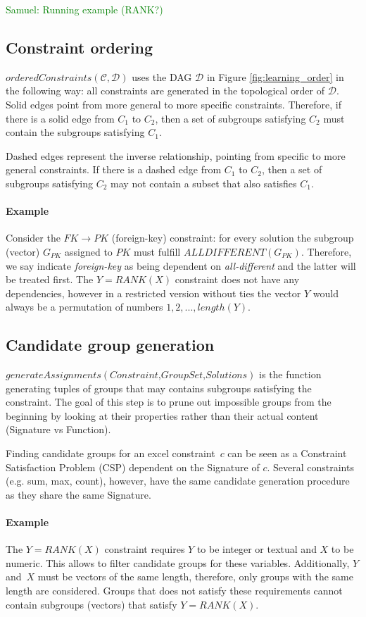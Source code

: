 \documentclass{ecai}
\newcommand{\samuel}[1]{\textcolor{green}{{\sc Samuel:} #1}\xspace}
\newcommand{\constraints}{\ensuremath{\mathcal{C}}\xspace}
\newcommand{\format}[1]{\textit{#1}\xspace}
\newcommand{\generategroups}{\format{generateAssignments}}
\newcommand{\constrainttorder}{\format{orderedConstraints}}
\newcommand{\CSignature}{Signature\xspace}
\newcommand{\CFunction}{Function\xspace}
\newcommand{\dependencies}{\ensuremath{\mathcal{D}}\xspace}
\newcommand{\ecrank}[2]{\ensuremath{#1 = \mathit{RANK}(#2)}}
\newcommand{\ecfkey}[2]{\ensuremath{#1 \rightarrow #2}}
\newcommand{\ecalldiff}[1]{\ensuremath{\mathit{ALLDIFFERENT}(#1)}}
\begin{document}
\samuel{Running example (RANK?)}
\subsection{Constraint ordering} $\constrainttorder(\constraints,\dependencies)$ uses the DAG \dependencies in Figure \ref{fig:learning_order} in the following way: all constraints are generated in the topological order of \dependencies.
Solid edges point from more general to more specific constraints.
Therefore, if there is a solid edge from $C_1$ to $C_2$, then a set of subgroups satisfying $C_2$ must contain the subgroups satisfying $C_1$.

Dashed edges represent the inverse relationship, pointing from specific to more general constraints.
If there is a dashed edge from $C_1$ to $C_2$, then a set of subgroups satisfying $C_2$ may not contain a subset that also satisfies $C_1$.

\paragraph{Example}
Consider the \ecfkey{FK}{PK} (foreign-key) constraint: for every solution the subgroup (vector) $G_{PK}$ assigned to $PK$ must fulfill \ecalldiff{G_{PK}}.
Therefore, we say indicate \textit{foreign-key} as being dependent on \textit{all-different} and the latter will be treated first.
The \ecrank{Y}{X} constraint does not have any dependencies, however in a restricted version without ties the vector $Y$ would always be a permutation of numbers $1, 2, ..., length(Y)$.

\subsection{Candidate group generation}
$\generategroups(\textit{Constraint,GroupSet,Solutions})$ is the function generating tuples of groups that may contains subgroups satisfying the constraint.
The goal of this step is to prune out impossible groups from the beginning by looking at their properties rather than their actual content (\CSignature vs \CFunction).

Finding candidate groups for an excel constraint~$c$ can be seen as a Constraint Satisfaction Problem (CSP) dependent on the \CSignature of $c$.
Several constraints (e.g. sum, max, count), however, have the same candidate generation procedure as they share the same \CSignature.

\paragraph{Example}
The \ecrank{Y}{X} constraint requires $Y$ to be integer or textual and $X$ to be numeric.
This allows to filter candidate groups for these variables.
Additionally, $Y$ and~$X$ must be vectors of the same length, therefore, only groups with the same length are considered.
Groups that does not satisfy these requirements cannot contain subgroups (vectors) that satisfy \ecrank{Y}{X}.
\end{document}
